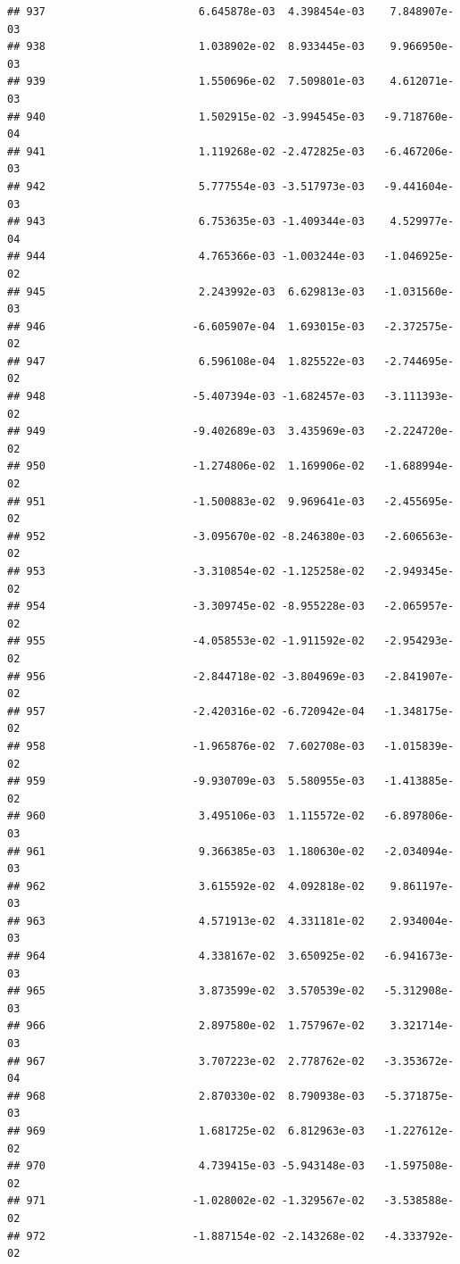 \documentclass[
]{article}
\begin{document}
\begin{verbatim}
## 937                        6.645878e-03  4.398454e-03    7.848907e-03
## 938                        1.038902e-02  8.933445e-03    9.966950e-03
## 939                        1.550696e-02  7.509801e-03    4.612071e-03
## 940                        1.502915e-02 -3.994545e-03   -9.718760e-04
## 941                        1.119268e-02 -2.472825e-03   -6.467206e-03
## 942                        5.777554e-03 -3.517973e-03   -9.441604e-03
## 943                        6.753635e-03 -1.409344e-03    4.529977e-04
## 944                        4.765366e-03 -1.003244e-03   -1.046925e-02
## 945                        2.243992e-03  6.629813e-03   -1.031560e-03
## 946                       -6.605907e-04  1.693015e-03   -2.372575e-02
## 947                        6.596108e-04  1.825522e-03   -2.744695e-02
## 948                       -5.407394e-03 -1.682457e-03   -3.111393e-02
## 949                       -9.402689e-03  3.435969e-03   -2.224720e-02
## 950                       -1.274806e-02  1.169906e-02   -1.688994e-02
## 951                       -1.500883e-02  9.969641e-03   -2.455695e-02
## 952                       -3.095670e-02 -8.246380e-03   -2.606563e-02
## 953                       -3.310854e-02 -1.125258e-02   -2.949345e-02
## 954                       -3.309745e-02 -8.955228e-03   -2.065957e-02
## 955                       -4.058553e-02 -1.911592e-02   -2.954293e-02
## 956                       -2.844718e-02 -3.804969e-03   -2.841907e-02
## 957                       -2.420316e-02 -6.720942e-04   -1.348175e-02
## 958                       -1.965876e-02  7.602708e-03   -1.015839e-02
## 959                       -9.930709e-03  5.580955e-03   -1.413885e-02
## 960                        3.495106e-03  1.115572e-02   -6.897806e-03
## 961                        9.366385e-03  1.180630e-02   -2.034094e-03
## 962                        3.615592e-02  4.092818e-02    9.861197e-03
## 963                        4.571913e-02  4.331181e-02    2.934004e-03
## 964                        4.338167e-02  3.650925e-02   -6.941673e-03
## 965                        3.873599e-02  3.570539e-02   -5.312908e-03
## 966                        2.897580e-02  1.757967e-02    3.321714e-03
## 967                        3.707223e-02  2.778762e-02   -3.353672e-04
## 968                        2.870330e-02  8.790938e-03   -5.371875e-03
## 969                        1.681725e-02  6.812963e-03   -1.227612e-02
## 970                        4.739415e-03 -5.943148e-03   -1.597508e-02
## 971                       -1.028002e-02 -1.329567e-02   -3.538588e-02
## 972                       -1.887154e-02 -2.143268e-02   -4.333792e-02

\end{verbatim}
\end{document}
